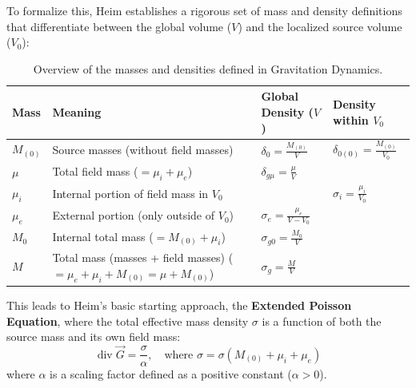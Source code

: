 \documentclass[11pt,a4paper,oneside]{article}
\begin{document}
To formalize this, Heim establishes a rigorous set of mass and density definitions that differentiate between the global volume ($V$) and the localized source volume ($V_0$):

\begin{table}[htbp]
\centering
\renewcommand{\arraystretch}{1.5}
\begin{tabular}{@{}p{1.2cm} p{6cm} p{3.5cm} p{3.5cm}@{}}
\toprule
\textbf{Mass} & \textbf{Meaning} & \textbf{Global Density ($V$)} & \textbf{Density within $V_0$} \\
\midrule
\rowcolor{theoryblue!5}
$M_{(0)}$ & Source masses (without field masses) & $\displaystyle \delta_0 = \frac{M_{(0)}}{V}$ & $\displaystyle \delta_{0(0)} = \frac{M_{(0)}}{V_0}$ \\
$\mu$ & Total field mass ($= \mu_i + \mu_e$) & $\displaystyle \delta_{g\mu} = \frac{\mu}{V}$ & \\
\rowcolor{theoryblue!5}
$\mu_i$ & Internal portion of field mass in $V_0$ & & $\displaystyle \sigma_i = \frac{\mu_i}{V_0}$ \\
$\mu_e$ & External portion (only outside of $V_0$) & $\displaystyle \sigma_e = \frac{\mu_e}{V - V_0}$ & \\
\rowcolor{theorygray!30}
$M_0$ & Internal total mass ($= M_{(0)} + \mu_i$) & $\displaystyle \sigma_{g0} = \frac{M_0}{V}$ & \\
$M$ & Total mass (masses + field masses) \newline ($= \mu_e + \mu_i + M_{(0)} = \mu + M_{(0)}$) & $\displaystyle \sigma_g = \frac{M}{V}$ & \\
\bottomrule
\end{tabular}
\caption{Overview of the masses and densities defined in Gravitation Dynamics.}
\end{table}

This leads to Heim's basic starting approach, the \textbf{Extended Poisson Equation}, where the total effective mass density $\sigma$ is a function of both the source mass and its own field mass:
\begin{equation}
    \operatorname{div} \vec{G} = \frac{\sigma}{\alpha}, \quad \text{where } \sigma = \sigma(M_{(0)} + \mu_i + \mu_e)
    \label{eq:heim_poisson}
\end{equation}
where $\alpha$ is a scaling factor defined as a positive constant ($\alpha > 0$).
\end{document}
